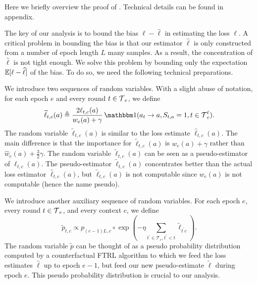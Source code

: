 Here we briefly overview the proof of . Technical details can be found in appendix.

The key of our analysis is to bound the bias $\ell - \widehat{\ell}$ in estimating the loss $\ell$. A critical problem in bounding the bias is that our estimator $\widehat{\ell}$ is only constructed from a number of epoch length $L$ many samples. As a result, the concentration of $\widehat{\ell}$ is not tight enough. We solve this problem by bounding only the expectation $\mathbb{E}[\ell - \widehat{\ell}]$ of the bias. To do so, we need the following technical preparations.  

We  introduce two sequences of random variables. With a slight abuse of notation, for each epoch $e$ and every round $t \in \operatorname{\mathcal{T}}_e$,  we define
\[\widetilde{\ell}_{t,c}(a) \triangleq \frac{2 \ell_{t,c}(a)}{w_e(a) + \gamma} \indi(a_t \rightarrow a, S_{t,a} = 1, t \in \Time_e^{\ell}).\]
The random variable $\widetilde{\ell}_{t,c}(a)$ is similar to the loss estimate $\widehat{\ell}_{t,c}(a)$. The main difference is that the importance for $\widetilde{\ell}_{t,c}(a)$ is $w_e(a) + \gamma$ rather than $\widehat{w}_e(a) + \frac{3}{2}\gamma$. The random variable $\widetilde{\ell}_{t,c}(a)$ can be seen as a pseudo-estimator of $\ell_{t,c}(a)$. 
%
The pseudo-estimator $\widetilde{\ell}_{t,c}(a)$ concentrates better than the actual loss estimator $\widehat{\ell}_{t,c}(a)$, but $\widetilde{\ell}_{t,c}(a)$ is not computable since $w_e(a)$ is not computable (hence the name pseudo).
%

We introduce another auxiliary sequence of random variables. For each epoch $e$, every round $t \in \operatorname{\mathcal{T}}_e$, and every context $c$, we define \[\widetilde{p}_{t,c} \propto p_{(e-1)L, c} \circ \exp \left(-\eta \sum_{t^{\prime} \in \mathcal{T}_e, t^{\prime}<t} \widetilde{\ell}_{t^{\prime} c}\right). \]
The random variable $\widetilde{p}$ can be thought of as a pseudo probability distribution computed by a counterfactual FTRL algorithm to which we feed the loss estimates $\widehat{\ell}$ up to epoch $e-1$, but feed our new pseudo-estimate $\widetilde{\ell}$ during epoch $e$. This pseudo probability distribution is crucial to our analysis. 

